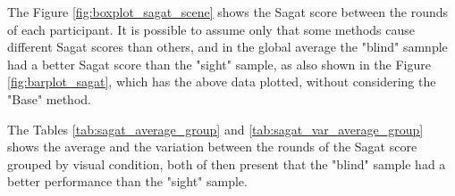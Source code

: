 The Figure \ref{fig:boxplot_sagat_scene} shows the Sagat score between the rounds of each participant. It is possible to assume only that some methods cause different Sagat scores than others, and in the global average the "blind" samnple had a better Sagat score than the "sight" sample, as also shown in the Figure \ref{fig:barplot_sagat}, which has the above data plotted, without considering the "Base" method.

%

The Tables \ref{tab:sagat_average_group} and \ref{tab:sagat_var_average_group} shows the average and the variation between the rounds of the Sagat score grouped by visual condition, both of then present that the "blind" sample had a better performance than the "sight" sample.





